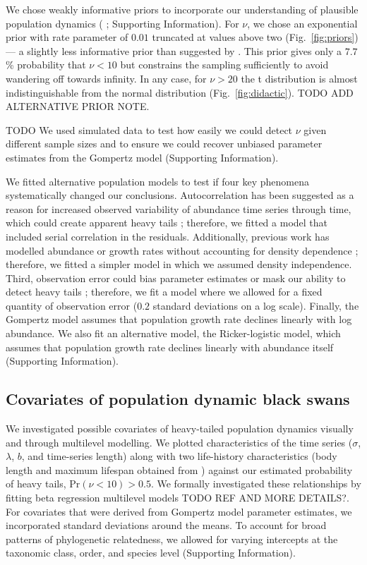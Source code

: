 We chose weakly informative priors to incorporate our understanding of plausible population dynamics (\citeauthor{gelman2014} \citeyear{gelman2014}; Supporting Information). For $\nu$, we chose an exponential prior with rate parameter of $0.01$ truncated at values above two (Fig.~\ref{fig:priors}) --- a slightly less informative prior than suggested by \citet{fernandez1998}. This prior gives only a $7.7$\% probability that $\nu < 10$ but constrains the sampling sufficiently to avoid wandering off towards infinity. In any case,  for $\nu > 20$ the t distribution is almost indistinguishable from the normal distribution (Fig.~\ref{fig:didactic}). TODO ADD ALTERNATIVE PRIOR NOTE.

TODO We used simulated data to test how easily we could detect $\nu$ given different sample sizes and to ensure we could recover unbiased parameter estimates from the Gompertz model (Supporting Information).

We fitted alternative population models to test if four key phenomena systematically changed our conclusions. Autocorrelation has been suggested as a reason for increased observed variability of abundance time series through time, which could create apparent heavy tails \citep{inchausti2002}; therefore, we fitted a model that included serial correlation in the residuals. Additionally, previous work has modelled abundance or growth rates without accounting for density dependence \citep{halley2002,segura2013}; therefore, we fitted a simpler model in which we assumed density independence. Third, observation error could bias parameter estimates \citep{knape2012} or mask our ability to detect heavy tails \citep{ward2007}; therefore, we fit a model where we allowed for a fixed quantity of observation error ($0.2$ standard deviations on a log scale). Finally, the Gompertz model assumes that population growth rate declines linearly with log abundance. We also fit an alternative model, the Ricker-logistic model, which assumes that population growth rate declines linearly with abundance itself (Supporting Information).

\subsection{Covariates of population dynamic black swans}

We investigated possible covariates of heavy-tailed population dynamics visually and through multilevel modelling. We plotted characteristics of the time series ($\sigma$, $\lambda$, $b$, and time-series length) along with two life-history characteristics (body length and maximum lifespan obtained from \citet{brook2006a}) against our estimated probability of heavy tails, Pr$(\nu < 10) > 0.5$. We formally investigated these relationships by fitting beta regression multilevel models TODO REF AND MORE DETAILS?. For covariates that were derived from Gompertz model parameter estimates, we incorporated standard deviations around the means. To account for broad patterns of phylogenetic relatedness, we allowed for varying intercepts at the taxonomic class, order, and species level (Supporting Information).

